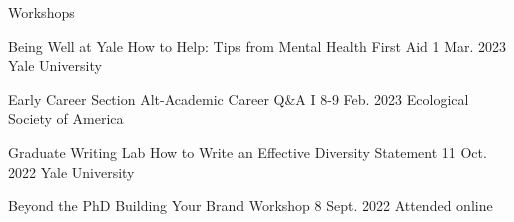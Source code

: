 Workshops

\begin{cventries}

  \cventry
    {Being Well at Yale} %
    {How to Help: Tips from Mental Health First Aid} %
    {1 Mar. 2023} %
    {Yale University} %
    {
    }

  \cventry
    {Early Career Section} %
    {Alt-Academic Career Q\&A I} %
    {8-9 Feb. 2023} %
    {Ecological Society of America} %
    {
    }    

  \cventry
    {Graduate Writing Lab} %
    {How to Write an Effective Diversity Statement} %
    {11 Oct. 2022} %
    {Yale University} %
    {
    }

  \cventry
    {Beyond the PhD} %
    {Building Your Brand Workshop} %
    {8 Sept. 2022} %
    {Attended online} %
    {
    }



\end{cventries}
